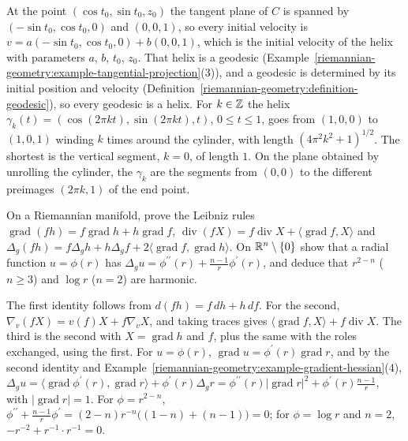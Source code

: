 \begin{solution}
At the point $(\cos t_0, \sin t_0, z_0)$ the tangent plane of $C$ is spanned by $(-\sin t_0, \cos t_0, 0)$ and $(0, 0, 1)$, so every initial velocity is $v = a(-\sin t_0, \cos t_0, 0) + b(0, 0, 1)$, which is the initial
velocity of the helix with parameters $a$, $b$, $t_0$, $z_0$. That helix is a geodesic (Example~\ref{riemannian-geometry:example-tangential-projection}(3)), and a geodesic is determined by its initial position and
velocity (Definition~\ref{riemannian-geometry:definition-geodesic}), so every geodesic is a helix. For $k \in \mathbb{Z}$ the helix $\gamma_k(t) = (\cos(2\pi kt), \sin(2\pi kt), t)$, $0 \leq t \leq 1$, goes from $(1, 0, 0)$
to $(1, 0, 1)$ winding $k$ times around the cylinder, with length $(4\pi^2k^2 + 1)^{1/2}$. The shortest is the vertical segment, $k = 0$, of length $1$. On the plane obtained by unrolling the cylinder,
the $\gamma_k$ are the segments from $(0, 0)$ to the different preimages $(2\pi k, 1)$ of the end point.
\end{solution}

\begin{exercise}\label{riemannian-geometry:exercise-gradient-identities}
On a Riemannian manifold, prove the Leibniz rules $\operatorname{grad}(fh) = f\operatorname{grad}h + h\operatorname{grad}f$, $\operatorname{div}(fX) = f\operatorname{div}X + \langle\operatorname{grad}f, X\rangle$ and
$\Delta_g(fh) = f\Delta_gh + h\Delta_gf + 2\langle\operatorname{grad}f, \operatorname{grad}h\rangle$. On $\mathbb{R}^n \setminus \{0\}$ show that a radial function $u = \phi(r)$ has $\Delta_gu = \phi^{\prime\prime}(r) + \frac{n-1}{r}\phi^{\prime}(r)$, and
deduce that $r^{2-n}$ ($n \geq 3$) and $\log r$ ($n = 2$) are harmonic.
\end{exercise}

\begin{solution}
The first identity follows from $d(fh) = f\,dh + h\,df$. For the second, $\nabla_v(fX) = v(f)X + f\nabla_vX$, and taking traces gives $\langle\operatorname{grad}f, X\rangle + f\operatorname{div}X$. The third is the second with
$X = \operatorname{grad}h$ and $f$, plus the same with the roles exchanged, using the first. For $u = \phi(r)$, $\operatorname{grad}u = \phi^{\prime}(r)\operatorname{grad}r$, and by the second identity and
Example~\ref{riemannian-geometry:example-gradient-hessian}(4), $\Delta_gu = \langle\operatorname{grad}\phi^{\prime}(r), \operatorname{grad}r\rangle + \phi^{\prime}(r)\Delta_gr = \phi^{\prime\prime}(r)|\operatorname{grad}r|^2 + \phi^{\prime}(r)\frac{n-1}{r}$,
with $|\operatorname{grad}r| = 1$. For $\phi = r^{2-n}$, $\phi^{\prime\prime} + \frac{n-1}{r}\phi^{\prime} = (2-n)r^{-n}\bigl((1-n) + (n-1)\bigr) = 0$; for $\phi = \log r$ and $n = 2$, $-r^{-2} + r^{-1} \cdot r^{-1} = 0$.
\end{solution}

